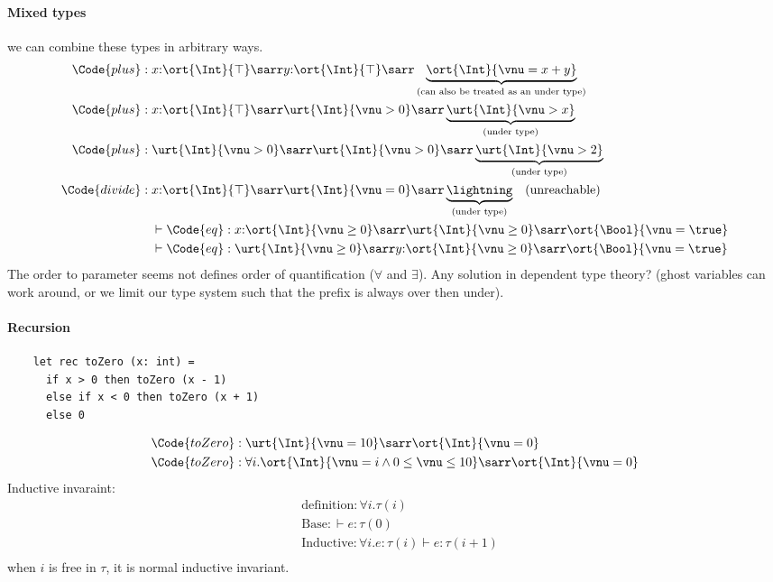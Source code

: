 \paragraph{Mixed types} we can combine these types in arbitrary ways.
\begin{align*}
    \Code{plus} :\;& x{:}\ort{\Int}{\top} \sarr y{:}\ort{\Int}{\top} \sarr \underbrace{\ort{\Int}{\vnu = x + y}}_{(\text{can also be treated as an under type})} \\
    \Code{plus} :\;& x{:}\ort{\Int}{\top} \sarr \urt{\Int}{\vnu > 0} \sarr \underbrace{\urt{\Int}{\vnu > x}}_{(\text{under type})} \\
    \Code{plus} :\;& \urt{\Int}{\vnu > 0} \sarr \urt{\Int}{\vnu > 0} \sarr \underbrace{\urt{\Int}{\vnu > 2}}_{(\text{under type})} \\
    \Code{divide} :\;& x{:}\ort{\Int}{\top} \sarr \urt{\Int}{\vnu = 0} \sarr \underbrace{\lightning}_{(\text{under type})} \quad (\text{unreachable}) \\
    &\vdash \Code{eq} : x{:}\ort{\Int}{\vnu \geq 0} \sarr \urt{\Int}{\vnu \geq 0} \sarr \ort{\Bool}{\vnu = \true} \\
    &\vdash \Code{eq} : \urt{\Int}{\vnu \geq 0} \sarr y{:}\ort{\Int}{\vnu \geq 0} \sarr \ort{\Bool}{\vnu = \true} \\
\end{align*}\noindent
The order to parameter seems not defines order of quantification ($\forall$ and $\exists$). Any solution in dependent type theory? (ghost variables can work around, or we limit our type system such that the prefix is always over then under).

\paragraph{Recursion}
\begin{verbatim}
    let rec toZero (x: int) =
      if x > 0 then toZero (x - 1) 
      else if x < 0 then toZero (x + 1)
      else 0
\end{verbatim}
\begin{align*}
    &\Code{toZero} : \urt{\Int}{\vnu  = 10} \sarr \ort{\Int}{\vnu = 0} \\
    &\Code{toZero} : \forall i. \ort{\Int}{\vnu = i \land 0 \leq \vnu \leq 10} \sarr \ort{\Int}{\vnu = 0}
\end{align*}\noindent
Inductive invaraint:
\begin{align*}
    &\text{definition}: \forall i. \tau(i) \\
    &\text{Base}: \vdash e {:} \tau(0) \\
    &\text{Inductive}: \forall i. e{:}\tau(i) \vdash e {:} \tau(i + 1) \\
\end{align*}\noindent
when $i$ is free in $\tau$, it is normal inductive invariant.

